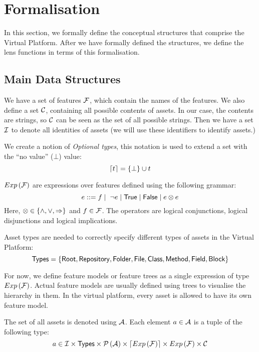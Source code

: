 \chapter{Formalisation}\label{sec:vp:formalisation}
In this section, we formally define the conceptual structures that comprise the
Virtual Platform. After we have formally defined the structures, we define the
lens functions in terms of this formalisation.

\section{Main Data Structures}
We have a set of features \(\mathcal{F}\), which contain the names of the
features. We also define a set \(\mathcal{C}\), containing all possible
contents of assets. In our case, the contents are strings, so \(\mathcal{C}\)
can be seen as the set of all possible strings. Then we have a
set \(\mathcal{I}\) to denote all identities of assets (we will use these identifiers to
identify assets.)

\noindent
We create a notion of \emph{Optional types}, this notation is used to extend a set
with the ``no value'' (\( \bot \)) value:
\[
  \lceil t \rceil = \left\{ \bot \right\} \cup t
\]

\noindent
\( Exp \left( \mathcal{F} \right) \) are expressions over features defined using the
following grammar:
\[
  e ::= f \mid \hspace*{1mm} \neg e \mid {\sf True} \mid {\sf False} \mid e \otimes e
\]
Here, \( \otimes \in \left\{ \land , \lor , \Rightarrow \right\} \)
and \( f \in \mathcal{F} \). The operators are logical conjunctions,
logical disjunctions and logical implications.

\noindent
Asset types are needed to correctly specify different types of assets in the
Virtual Platform:
\[
  {\sf Types} = \left\{ {\sf Root} , {\sf Repository} , {\sf Folder} , {\sf File} , {\sf Class} , {\sf Method} , {\sf Field} , {\sf Block} \right\}
\]

For now, we define feature models or feature trees as a single expression
of type \(Exp \left( \mathcal{F} \right)\). Actual feature models are usually defined
using trees to visualise the hierarchy in them. In the virtual platform, every
asset is allowed to have its own feature model.

\noindent
The set of all assets is denoted using \( \mathcal{A} \). Each element 
\(a \in \mathcal{A} \) is a tuple of the following type:
\[
  a \in \mathcal{I} \times {\sf Types} \times \mathcal{P} \left(\mathcal{A}\right) \times \lceil Exp \left( \mathcal{F} \right) \rceil \times Exp \left( \mathcal{F} \right) \times \mathcal{C}
\]


